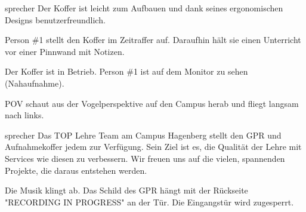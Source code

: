\documentclass{screenplay}
\begin{document}
	\begin{dialogue}{sprecher}
		Der Koffer ist leicht zum Aufbauen und dank seines ergonomischen Designs benutzerfreundlich.
	\end{dialogue}
	
	
	Person \#1 stellt den Koffer im Zeitraffer auf. Daraufhin hält sie einen Unterricht vor einer Pinnwand mit Notizen.
	
	Der Koffer ist in Betrieb. Person \#1 ist auf dem Monitor zu sehen (Nahaufnahme).
	
	
	POV schaut aus der Vogelperspektive auf den Campus herab und fliegt langsam nach links.
	
	\begin{dialogue}{sprecher}
		Das TOP Lehre Team am Campus Hagenberg stellt den GPR und Aufnahmekoffer jedem zur Verfügung. Sein Ziel ist es, die Qualität der Lehre mit Services wie diesen zu verbessern. Wir freuen uns auf die vielen, spannenden Projekte, die daraus entstehen werden.
	\end{dialogue}
	
	
	Die Musik klingt ab. Das Schild des GPR hängt mit der Rückseite "RECORDING IN PROGRESS" an der Tür. Die Eingangstür wird zugesperrt.
	
	\fadeout
	\theend
\end{document}
